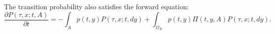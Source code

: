The transition probability also satisfies the forward equation:
$$\frac{\partial P(\tau, x; t, A)}{\partial t} = -\int_A p(t, y) P(\tau, x; t, dy) + \int_{\Omega_X} p(t, y) \Pi(t, y, A) P(\tau, x; t, dy).$$
